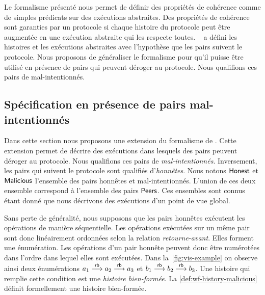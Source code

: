 Le formalisme présenté nous permet de définir des propriétés de cohérence comme de simples prédicats sur des exécutions abstraites.
Des propriétés de cohérence sont garanties par un protocole si chaque histoire du protocole peut être augmentée en une exécution abstraite qui les respecte toutes.
~\textcite{burckhardt_eventualconsistency_2014} a défini les histoires et les exécutions abstraites avec l'hypothèse que les pairs  suivent le protocole.
Nous proposons de généraliser le formalisme pour qu'il puisse être utilisé en présence de pairs qui peuvent déroger au protocole.
Nous qualifions ces pairs de mal-intentionnés.


\subsection{Spécification en présence de pairs mal-intentionnés}\label{subsec:consistency-spec-malicious}

%

Dans cette section nous proposons une extension du formalisme de \textcite{burckhardt_eventualconsistency_2014}.
Cette extension permet de décrire des exécutions dans lesquels des pairs peuvent déroger au protocole.
Nous qualifions ces pairs de \emph{mal-intentionnés}.
Inversement, les pairs qui suivent le protocole sont qualifiés d'\emph{honnêtes}.
Nous notons $\operatorname{\mathsf{Honest}}$ et $\operatorname{\mathsf{Malicious}}$ l'ensemble des pairs honnêtes et mal-intentionnés.
L'union de ces deux ensemble correspond à l'ensemble des pairs $\operatorname{\mathsf{Peers}}$.
Ces ensembles sont connus étant donné que nous décrivons des exécutions d'un point de vue global.

Sans perte de généralité, nous supposons que les pairs honnêtes exécutent les opérations de manière séquentielle.
Les opérations exécutées sur un même pair sont donc linéairement ordonnées selon la relation \emph{retourne-avant}.
Elles forment une énumération.
Les opérations d'un pair honnête peuvent donc être numérotées dans l'ordre dans lequel elles sont exécutées.
Dans la~\autoref{fig:vis-example} on observe ainsi deux énumérations $a_1 \overset{\mathsf{rb}}{\longrightarrow} a_2 \overset{\mathsf{rb}}{\longrightarrow} a_3$ et $b_1 \overset{\mathsf{rb}}{\longrightarrow} b_2 \overset{\mathsf{rb}}{\longrightarrow} b_3$.
Une histoire qui remplie cette condition est une \emph{histoire bien-formée}.
La \autoref{def:wf-history-malicious} définit formellement une histoire bien-formée.

